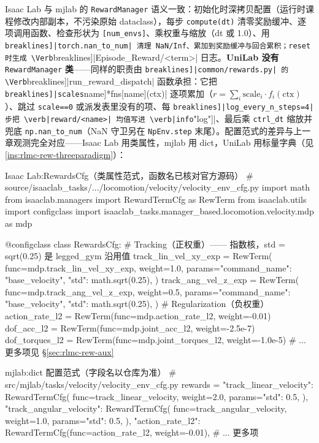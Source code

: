 Isaac Lab 与 mjlab 的 \verb|RewardManager| 语义一致：初始化时深拷贝配置（运行时课程修改内部副本，不污染原始 dataclass），每步 \verb|compute(dt)| 清零奖励缓冲、逐项调用函数、检查形状为 \verb|[num_envs]|、乘权重与缩放（dt 或 1.0）、用 \Verb[breaklines]|torch.nan_to_num| 清理 NaN/Inf、累加到奖励缓冲与回合累积；reset 时生成 \Verb[breaklines]|Episode_Reward/<term>| 日志。\textbf{UniLab 没有} \verb|RewardManager| \textbf{类}——同样的职责由 \Verb[breaklines]|common/rewards.py| 的 \Verb[breaklines]|run_reward_dispatch| 函数承担：它把 \Verb[breaklines]|scales[name]*fns[name](ctx)| 逐项累加（$r=\sum_i \text{scale}_i\cdot f_i(\text{ctx})$）、跳过 \verb|scale==0| 或派发表里没有的项、每 \Verb[breaklines]|log_every_n_steps=4| 步把 \verb|reward/<name>| 均值写进 \verb|info["log"]|、最后乘 \verb|ctrl_dt| 缩放并兜底 \verb|np.nan_to_num|（NaN 守卫另在 \verb|NpEnv.step| 末尾）。配置范式的差异与上一章观测完全对应——Isaac Lab 用类属性，mjlab 用 dict，UniLab 用标量字典（见 \cref{ins:rlmc-rew-threeparadigm}）：

\begin{codebox}[Python]{Isaac Lab:RewardsCfg（类属性范式，函数名已核对官方源码）}
# source/isaaclab_tasks/.../locomotion/velocity/velocity_env_cfg.py
import math
from isaaclab.managers import RewardTermCfg as RewTerm
from isaaclab.utils import configclass
import isaaclab_tasks.manager_based.locomotion.velocity.mdp as mdp

@configclass
class RewardsCfg:
    # Tracking（正权重）—— 指数核，std = sqrt(0.25) 是 legged_gym 沿用值
    track_lin_vel_xy_exp = RewTerm(
        func=mdp.track_lin_vel_xy_exp, weight=1.0,
        params={"command_name": "base_velocity", "std": math.sqrt(0.25)},
    )
    track_ang_vel_z_exp = RewTerm(
        func=mdp.track_ang_vel_z_exp, weight=0.5,
        params={"command_name": "base_velocity", "std": math.sqrt(0.25)},
    )
    # Regularization（负权重）
    action_rate_l2 = RewTerm(func=mdp.action_rate_l2, weight=-0.01)
    dof_acc_l2     = RewTerm(func=mdp.joint_acc_l2, weight=-2.5e-7)
    dof_torques_l2 = RewTerm(func=mdp.joint_torques_l2, weight=-1.0e-5)
    # ... 更多项见 §\ref{sec:rlmc-rew-aux}
\end{codebox}

\begin{codebox}[Python]{mjlab:dict 配置范式（字段名以仓库为准）}
# src/mjlab/tasks/velocity/velocity_env_cfg.py
rewards = {
    "track_linear_velocity": RewardTermCfg(
        func=track_linear_velocity, weight=2.0, params={"std": 0.5},
    ),
    "track_angular_velocity": RewardTermCfg(
        func=track_angular_velocity, weight=1.0, params={"std": 0.5},
    ),
    "action_rate_l2": RewardTermCfg(func=action_rate_l2, weight=-0.01),
    # ... 更多项
}
\end{codebox}

